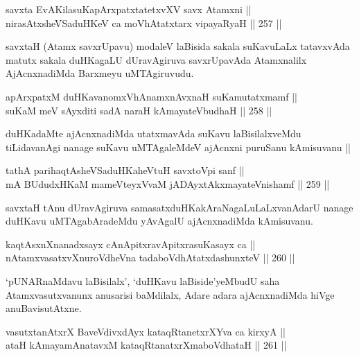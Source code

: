 \begin{shl}
savxta EvAKilasuKapArxpatxtatetxvXV savx Atamxni || \\
nirasAtxsheVSaduHKeV ca moVhAtatxtarx vipayaRyaH \hfill || 257 ||  
\end{shl}

\begin{artha}
savxtaH (Atamx savxrUpavu) modaleV laBisida sakala suKavuLaLx
tatavxvAda matutx sakala duHKagaLU dUravAgiruva savxrUpavAda
Atamxnalilx AjAcnxnadiMda Barxmeyu uMTAgiruvudu.
\end{artha}


\begin{shl}
apArxpatxM duHKavanomxVhAnamxnAvxnaH suKamutatxmamf || \\
suKaM meV sAyxditi sadA naraH kAmayateV\s budhaH \hfill || 258 ||  
\end{shl}

\begin{artha}
duHKadaMte ajAcnxnadiMda utatxmavAda suKavu laBisilalxveMdu
tiLidavanAgi nanage suKavu uMTAgaleMdeV ajAcnxni puruSanu kAmisuvanu ||
\end{artha}

\begin{shl}
tathA parihaqtAsheVSaduHKaheVtuH savxtoV\s pi sanf || \\
mA BUdudxHKaM mameVteyxVvaM jADAyxtAkxmayateV\s nishamf \hfill || 259 || 
\end{shl}

\begin{artha}
savxtaH tAnu dUravAgiruva samasatxduHKakAraNagaLuLaLxvanAdarU nanage
duHKavu uMTAgabAradeMdu yAvAgalU ajAcnxnadiMda kAmisuvanu.
\end{artha}

\begin{shl}
kaqtAsxnXnanadxsayx cAnApitxravApitxrasuKasayx ca || \\
nA\s \s tamxvasatxvXnuroVdheVna tadaboVdhAtatxdashunxteV \hfill || 260 ||  
\end{shl}

\begin{artha}
`pUNARnaMdavu laBisilalx', `duHKavu laBiside'yeMbudU saha
Atamxvasutxvanunx anusarisi baMdilalx, Adare adara ajAcnxnadiMda hiVge anuBavisutAtxne.
\end{artha}

\begin{shl}
vasutxtanAtxrX BaveVdivxdAyx kataqRtanetxrXYva ca kirxyA ||  \\
ataH kAmayamAnatavxM kataqRtanatxrXmaboVdhataH \hfill || 261 ||  
\end{shl}

